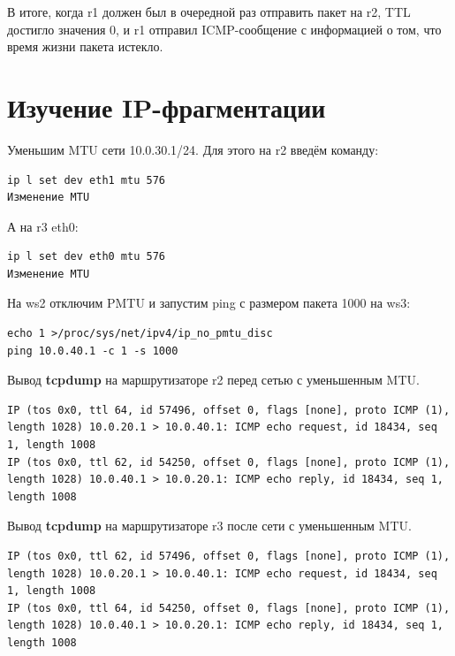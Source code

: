 \documentclass[a4paper,12pt]{article}
\begin{document}
В итоге, когда r1 должен был в очередной раз отправить пакет на r2,  TTL достигло значения 0, и  r1 отправил ICMP-сообщение с информацией о том, что время жизни пакета истекло.

\section{Изучение IP-фрагментации}

Уменьшим MTU сети 10.0.30.1/24. Для этого на r2 введём команду:

\begin{Verbatim}
ip l set dev eth1 mtu 576
Изменение MTU
\end{Verbatim}

А на r3 eth0:
\begin{Verbatim}
ip l set dev eth0 mtu 576
Изменение MTU
\end{Verbatim}


На ws2 отключим PMTU и запустим ping с размером пакета 1000 на ws3:

\begin{Verbatim}
echo 1 >/proc/sys/net/ipv4/ip_no_pmtu_disc
ping 10.0.40.1 -c 1 -s 1000
\end{Verbatim}

Вывод \textbf{tcpdump} на маршрутизаторе r2 перед сетью с уменьшенным MTU.


\begin{Verbatim}
IP (tos 0x0, ttl 64, id 57496, offset 0, flags [none], proto ICMP (1), length 1028) 10.0.20.1 > 10.0.40.1: ICMP echo request, id 18434, seq 1, length 1008
IP (tos 0x0, ttl 62, id 54250, offset 0, flags [none], proto ICMP (1), length 1028) 10.0.40.1 > 10.0.20.1: ICMP echo reply, id 18434, seq 1, length 1008
\end{Verbatim}

Вывод \textbf{tcpdump} на маршрутизаторе r3 после сети с уменьшенным MTU.


\begin{Verbatim}
IP (tos 0x0, ttl 62, id 57496, offset 0, flags [none], proto ICMP (1), length 1028) 10.0.20.1 > 10.0.40.1: ICMP echo request, id 18434, seq 1, length 1008
IP (tos 0x0, ttl 64, id 54250, offset 0, flags [none], proto ICMP (1), length 1028) 10.0.40.1 > 10.0.20.1: ICMP echo reply, id 18434, seq 1, length 1008
\end{Verbatim}
\end{document}

